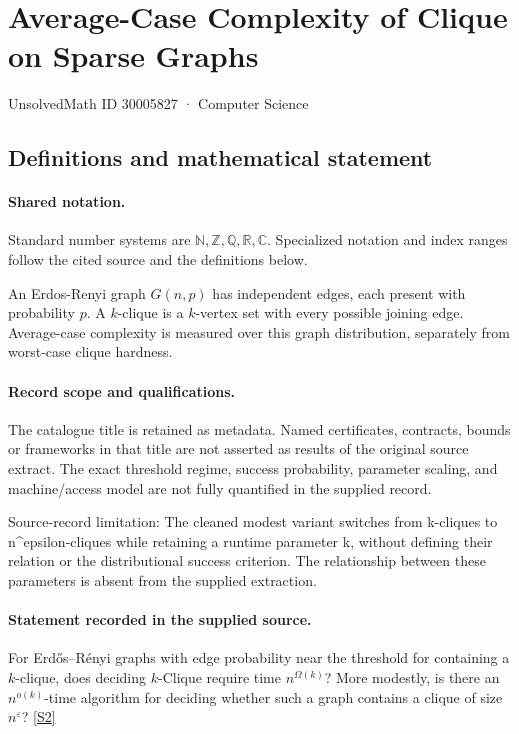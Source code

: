 \documentclass[11pt]{article}
\newcommand{\sref}[2]{\hyperlink{source:#1:#2}{[S#2]}}
\begin{document}
\setcounter{section}{30005826}
\section{Average-Case Complexity of Clique on Sparse Graphs}\label{30005827}
{\small\sffamily UnsolvedMath ID 30005827 · Computer Science}
\subsection{Definitions and mathematical statement}

\paragraph{Shared notation.}Standard number systems are $\mathbb N,\mathbb Z,\mathbb Q,\mathbb R,\mathbb C$. Specialized notation and index ranges follow the cited source and the definitions below.


An Erdos-Renyi graph $G(n,p)$ has independent edges, each present with probability $p$. A $k$-clique is a $k$-vertex set with every possible joining edge. Average-case complexity is measured over this graph distribution, separately from worst-case clique hardness.
\paragraph{Record scope and qualifications.}
The catalogue title is retained as metadata. Named certificates, contracts, bounds or frameworks in that title are not asserted as results of the original source extract.
The exact threshold regime, success probability, parameter scaling, and machine/access model are not fully quantified in the supplied record.

Source-record limitation: The cleaned modest variant switches from k-cliques to n^epsilon-cliques while retaining a runtime parameter k, without defining their relation or the distributional success criterion. The relationship between these parameters is absent from the supplied extraction.
\paragraph{Statement recorded in the supplied source.}
For Erdős–Rényi graphs with edge probability near the threshold for containing a $k$-clique, does deciding $k$-Clique require time $n^{\Omega(k)}$? More modestly, is there an $n^{o(k)}$-time algorithm for deciding whether such a graph contains a clique of size $n^\varepsilon$? \sref{30005827}{2}
\end{document}
